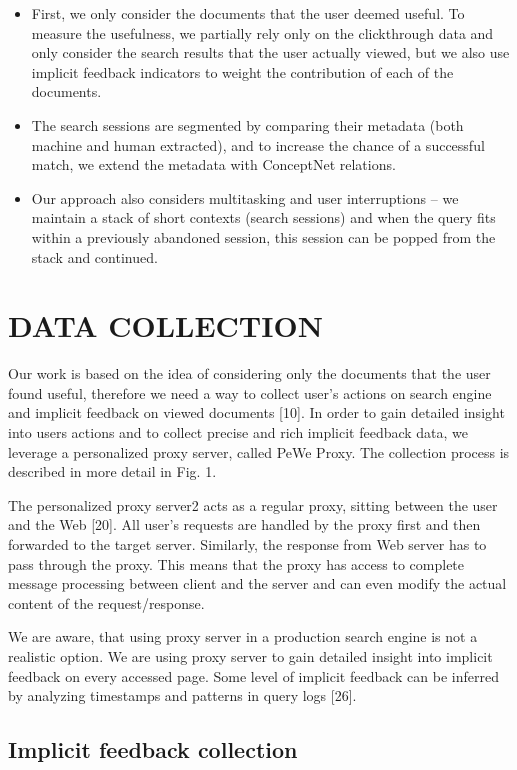 \documentclass{acm_proc_article-sp} %
\begin{document}
\begin{itemize} 
	\item First, we only consider the documents that the user
	deemed useful. To measure the usefulness, we partially
	rely only on the clickthrough data and only consider
	the search results that the user actually viewed, but
	we also use implicit feedback indicators to weight the
	contribution of each of the documents.
	\item The search sessions are segmented by comparing their
	metadata (both machine and human extracted), and
	to increase the chance of a successful match, we extend
	the metadata with ConceptNet relations.
	\item Our approach also considers multitasking and user interruptions
	– we maintain a stack of short contexts
	(search sessions) and when the query fits within a previously
	abandoned session, this session can be popped
	from the stack and continued.
\end{itemize}

\section{DATA COLLECTION}

Our work is based on the idea of considering only the documents
that the user found useful, therefore we need a way
to collect user’s actions on search engine and implicit feedback
on viewed documents [10]. In order to gain detailed
insight into users actions and to collect precise and rich implicit
feedback data, we leverage a personalized proxy server,
called PeWe Proxy. The collection process is described in
more detail in Fig. 1.

The personalized proxy server2
acts as a regular proxy, sitting
between the user and the Web [20]. All user’s requests
are handled by the proxy first and then forwarded to the
target server. Similarly, the response from Web server has
to pass through the proxy. This means that the proxy has
access to complete message processing between client and
the server and can even modify the actual content of the
request/response.

We are aware, that using proxy server in a production search
engine is not a realistic option. We are using proxy server to
gain detailed insight into implicit feedback on every accessed
page. Some level of implicit feedback can be inferred by
analyzing timestamps and patterns in query logs [26].

\subsection{Implicit feedback collection}
\end{document}
